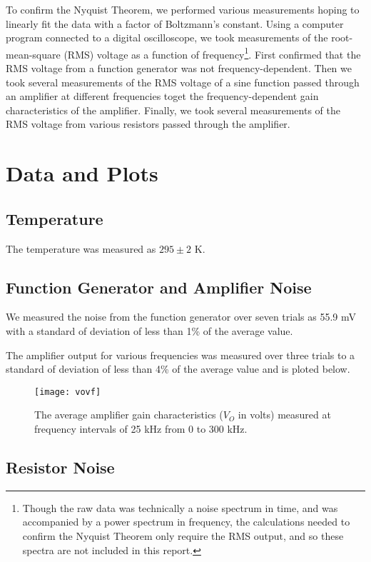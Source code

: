 \documentclass{article}
\begin{document}
To confirm the Nyquist Theorem, we performed various
measurements hoping to linearly fit the data with a factor of
Boltzmann's constant. Using a computer program connected to a
digital oscilloscope, we took measurements of the
root-mean-square (RMS) voltage as a function of
frequency\footnote{Though the raw data was technically a noise
spectrum in time, and was accompanied by a power spectrum in
frequency, the calculations needed to confirm the Nyquist
Theorem only require the RMS output, and so these spectra are
not included in this report.}. First confirmed that the RMS
voltage from a function generator was not frequency-dependent.
Then we took several measurements of the RMS voltage of a sine
function passed through an amplifier at different frequencies
toget the frequency-dependent gain characteristics of the
amplifier. Finally, we took several measurements of the RMS
voltage from various resistors passed through the amplifier.

\section{Data and Plots}

\subsection{Temperature}

The temperature was measured as $295 \pm 2$ K.

\subsection{Function Generator and Amplifier Noise}

We measured the noise from the function generator over seven
trials as 55.9 mV with a standard of deviation of less than 1\%
of the average value.

The amplifier output for various frequencies was measured over
three trials to a standard of deviation of less than 4\% of the
average value and is ploted below.

\begin{figure}[H] \texttt{[image: vovf]}
\centering \caption{The average amplifier gain characteristics
($V_O$ in volts) measured at frequency intervals of 25 kHz from
0 to 300 kHz.} \end{figure}

\subsection{Resistor Noise}
\end{document}
